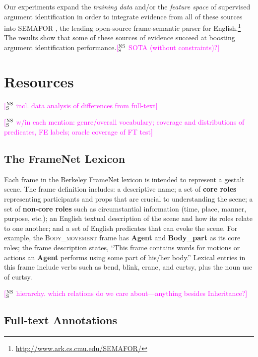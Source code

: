 \documentclass[11pt,a4paper]{article}
\newcommand{\ensuretext}[1]{#1}
\newcommand{\nssmarker}{\ensuretext{\textcolor{magenta}{\ensuremath{^{\textsc{NS}}_{\textsc{S}}}}}}
\newcommand{\arkcomment}[3]{\ensuretext{\textcolor{#3}{[#1 #2]}}}
\newcommand{\nss}[1]{\arkcomment{\nssmarker}{#1}{magenta}}
\newcommand{\fnf}[1]{\textsc{\textsf{#1}}} %
\newcommand{\fnr}[1]{\textbf{\textsf{#1}}} %
\newcommand{\fnlu}[1]{\textsf{#1}} %
\begin{document}
Our experiments expand the \emph{training data} and/or the \emph{feature space}
of supervised argument identification
in order to integrate evidence from all of these sources 
into SEMAFOR \citep{das-14}, the leading open-source frame-semantic parser for English.\footnote{\url{http://www.ark.cs.cmu.edu/SEMAFOR/}} 
The results show that some of these sources of evidence succeed 
at boosting argument identification performance.\nss{SOTA (without constraints)?}


\section{Resources}

\nss{incl. data analysis of differences from full-text}

\nss{w/in each mention: genre/overall vocabulary; coverage and distributions of predicates, FE labels; oracle coverage of FT test}

\subsection{The FrameNet Lexicon}\label{sec:lex}

Each frame in the Berkeley FrameNet lexicon is intended to represent a gestalt scene. 
The frame definition includes: a descriptive name; 
a set of \textbf{core roles} representing participants and props that are crucial 
to understanding the scene; a set of \textbf{non-core roles} such as circumstantial 
information (time, place, manner, purpose, etc.); 
an English textual description of the scene and how its roles relate to one another;
and a set of English predicates that can evoke the scene.
For example, the \fnf{Body\_movement} frame has \fnr{Agent} and \fnr{Body\_part} as its core roles; 
the frame description states,
``This frame contains words for motions or actions an \fnr{Agent} performs using some part of his/her body.''
Lexical entries in this frame include verbs such as \fnlu{bend}, \fnlu{blink}, \fnlu{crane}, and \fnlu{curtsy}, 
plus the noun use of \fnlu{curtsy}.

\nss{hierarchy. which relations do we care about---anything besides Inheritance?}

\subsection{Full-text Annotations}\label{sec:ft}
\end{document}
